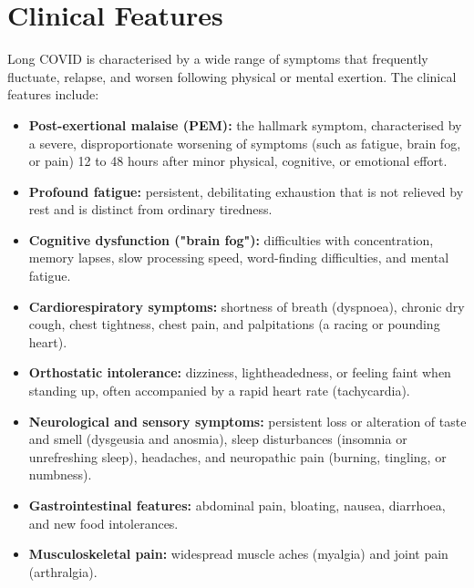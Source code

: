 \section*{Clinical Features}
Long COVID is characterised by a wide range of symptoms that frequently fluctuate, relapse, and worsen following physical or mental exertion. The clinical features include:
\begin{itemize}
    \item \textbf{Post-exertional malaise (PEM):} the hallmark symptom, characterised by a severe, disproportionate worsening of symptoms (such as fatigue, brain fog, or pain) 12 to 48 hours after minor physical, cognitive, or emotional effort.
    \item \textbf{Profound fatigue:} persistent, debilitating exhaustion that is not relieved by rest and is distinct from ordinary tiredness.
    \item \textbf{Cognitive dysfunction ("brain fog"):} difficulties with concentration, memory lapses, slow processing speed, word-finding difficulties, and mental fatigue.
    \item \textbf{Cardiorespiratory symptoms:} shortness of breath (dyspnoea), chronic dry cough, chest tightness, chest pain, and palpitations (a racing or pounding heart).
    \item \textbf{Orthostatic intolerance:} dizziness, lightheadedness, or feeling faint when standing up, often accompanied by a rapid heart rate (tachycardia).
    \item \textbf{Neurological and sensory symptoms:} persistent loss or alteration of taste and smell (dysgeusia and anosmia), sleep disturbances (insomnia or unrefreshing sleep), headaches, and neuropathic pain (burning, tingling, or numbness).
    \item \textbf{Gastrointestinal features:} abdominal pain, bloating, nausea, diarrhoea, and new food intolerances.
    \item \textbf{Musculoskeletal pain:} widespread muscle aches (myalgia) and joint pain (arthralgia).
\end{itemize}

